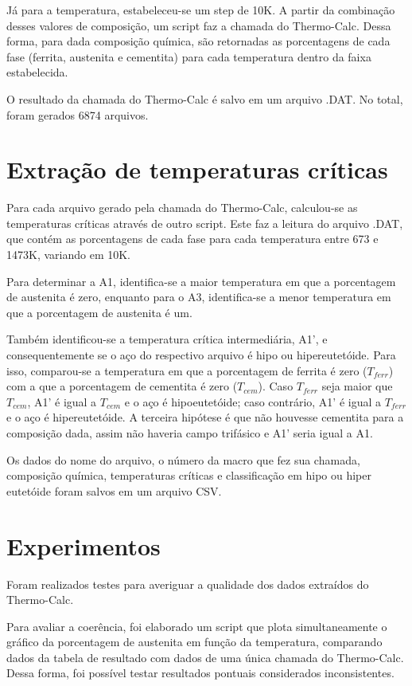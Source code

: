 \documentclass[brazil,dissertacao,epusp]{usp}
\begin{document}
Já para a temperatura, estabeleceu-se um step de 10K. A partir da combinação desses valores de composição, um script faz a chamada do Thermo-Calc\textregistered{}. Dessa forma, para dada composição química, são retornadas as porcentagens de cada fase (ferrita, austenita e cementita) para cada temperatura dentro da faixa estabelecida.

O resultado da chamada do Thermo-Calc\textregistered{} é salvo em um arquivo .DAT. No total, foram gerados 6874 arquivos.

\section{Extra\c{c}\~ao de temperaturas cr\'iticas}

Para cada arquivo gerado pela chamada do Thermo-Calc\textregistered{}, calculou-se as temperaturas críticas através de outro script. Este faz a leitura do arquivo .DAT, que contém as porcentagens de cada fase para cada temperatura entre 673 e 1473K, variando em 10K.

Para determinar a A1, identifica-se a maior temperatura em que a porcentagem de austenita é zero, enquanto para o A3, identifica-se a menor temperatura em que a porcentagem de austenita é um.

Também identificou-se a temperatura crítica intermediária, A1', e consequentemente se o aço do respectivo arquivo é hipo ou hipereutetóide. Para isso, comparou-se a temperatura em que a porcentagem de ferrita é zero ($T_{ferr}$) com a que a porcentagem de cementita é zero ($T_{cem}$). Caso $T_{ferr}$ seja maior que $T_{cem}$, A1' é igual a $T_{cem}$ e o aço é hipoeutetóide; caso contrário, A1' é igual a $T_{ferr}$ e o aço é hipereutetóide. A terceira hipótese é que não houvesse cementita para a composição dada, assim não haveria campo trifásico e A1' seria igual a A1.

Os dados do nome do arquivo, o número da macro que fez sua chamada, composição química, temperaturas críticas e classificação em hipo ou hiper eutetóide foram salvos em um arquivo CSV.

\section{Experimentos}

Foram realizados testes para averiguar a qualidade dos dados extraídos do Thermo-Calc\textregistered{}.

Para avaliar a coerência, foi elaborado um script que plota simultaneamente o gráfico da porcentagem de austenita em função da temperatura, comparando dados da tabela de resultado com dados de uma única chamada do Thermo-Calc\textregistered{}. Dessa forma, foi possível testar resultados pontuais considerados inconsistentes.
\end{document}
